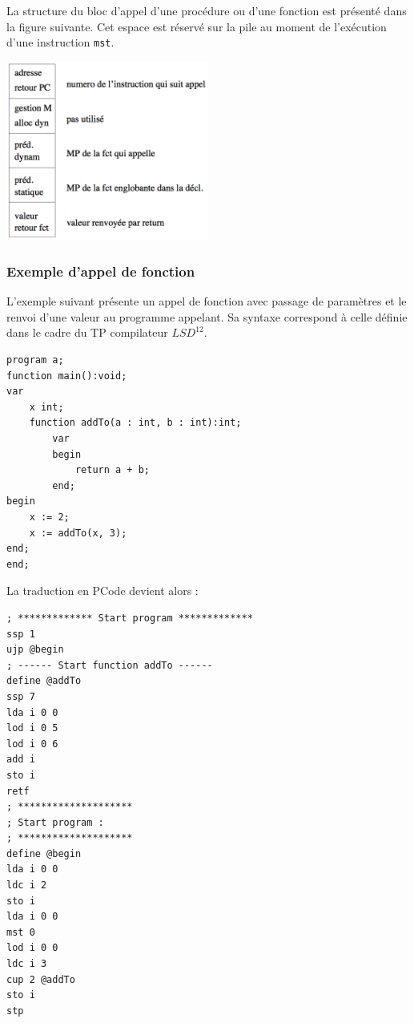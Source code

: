 \documentclass[french,11pt,twoside]{article}
\begin{document}
La structure du bloc d'appel d'une procédure ou d'une fonction est présenté dans la figure suivante. Cet espace est réservé sur la pile au moment de l'exécution d'une instruction \texttt{mst}.


\begin{center}
	\includegraphics[width=0.5\textwidth]{images/bloc-appel-proc}	
\end{center}
	
	
\subsubsection{Exemple d'appel de fonction}

L'exemple suivant présente un appel de fonction avec passage de paramètres et le renvoi d'une valeur au programme appelant. Sa syntaxe correspond à celle définie dans le cadre du TP compilateur $LSD^{{12}}$.

\lstset{language=lsd12,
breaklines=true,
showstringspaces=false,
frame=single
}
\begin{lstlisting}
program a;
function main():void;
var
	x int;
	function addTo(a : int, b : int):int;
		var
 		begin
			return a + b;
		end;
begin
	x := 2;
	x := addTo(x, 3);
end;
end;
\end{lstlisting}

La traduction en PCode devient alors :

\lstset{language=pcode,
breaklines=true,
showstringspaces=false,
frame=single
}
\begin{lstlisting}
; ************* Start program *************
ssp 1
ujp @begin
; ------ Start function addTo ------
define @addTo
ssp 7
lda i 0 0
lod i 0 5
lod i 0 6
add i
sto i
retf
; ********************
; Start program :
; ********************
define @begin
lda i 0 0
ldc i 2
sto i
lda i 0 0
mst 0
lod i 0 0
ldc i 3
cup 2 @addTo
sto i
stp
\end{lstlisting}
\end{document}
